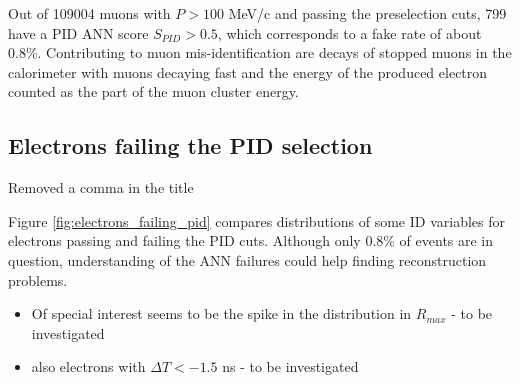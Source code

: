 Out of 109004 muons {\blue with} $P > 100$ {\blue MeV/c} and passing the preselection cuts, 799 have 
{\blue a} PID ANN score $S_{PID} > 0.5$,
which corresponds to  {\blue a} fake rate of about 0.8\%. Contributing to muon mis-identification are decays of
stopped muons in the calorimeter with muons decaying fast and the energy of the produced electron counted
as the part of the muon cluster energy. 


\subsection { Electrons failing the PID selection}
\label{sec:electrons_failing_pid}
{\blue Removed a comma in the title}

Figure \ref{fig:electrons_failing_pid} compares distributions  {\blue of} some ID variables for electrons 
passing and failing the PID cuts.
Although only 0.8\%  {\blue of} events are in question, understanding of the ANN failures could help finding 
reconstruction problems.
\begin{itemize}
\item 
  {\red Of special interest seems to be the spike in the distribution in $R_{max}$ - to be investigated}
\item
  {\red also electrons with $\Delta{T} < -1.5$ ns - to be investigated}
\end{itemize}

